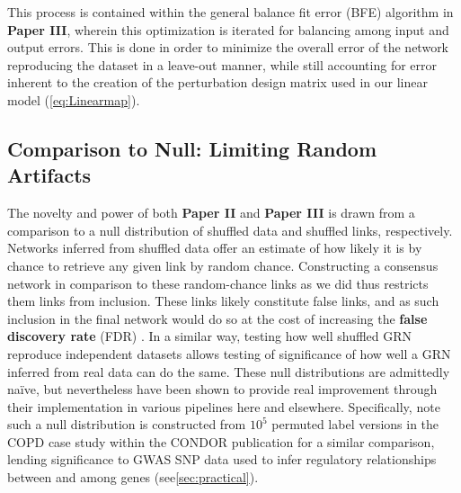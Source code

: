 This process is contained within the general balance fit error (BFE) algorithm in \textbf{Paper III}, wherein this optimization is iterated for balancing among input and output errors. This is done in order to minimize the overall error of the network reproducing the dataset in a leave-out manner, while still accounting for error inherent to the creation of the perturbation design matrix used in our linear model (\cref{eq:Linearmap}).

\subsection{Comparison to Null: Limiting Random Artifacts}
\label{sec:null}
The novelty and power of both \textbf{Paper II} and \textbf{Paper III} is drawn from a comparison to a null distribution of shuffled data and shuffled links, respectively. Networks inferred from shuffled data offer an estimate of how likely it is by chance to retrieve any given link by random chance. Constructing a consensus network in comparison to these random-chance links as we did thus restricts them links from inclusion. These links likely constitute false links, and as such inclusion in the final network would do so at the cost of increasing the \textbf{false discovery rate} (FDR) \citep{kall2007posterior}. In a similar way, testing how well shuffled GRN reproduce independent datasets allows testing of significance of how well a GRN inferred from real data can do the same. These null distributions are admittedly na{\"i}ve, but nevertheless have been shown to provide real improvement through their implementation in various pipelines here and elsewhere. Specifically, note such a null distribution is constructed from $10^5$ permuted label versions \cite{platig2016bipartite} in the COPD case study within the CONDOR publication for a similar comparison, lending significance to GWAS SNP data used to infer regulatory relationships between and among genes (see\cref{sec:practical}).